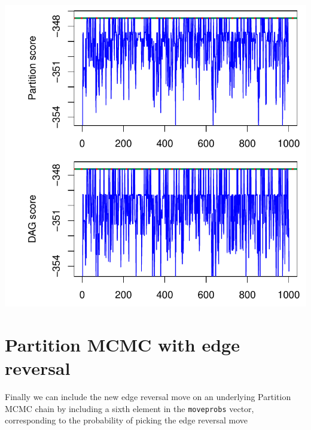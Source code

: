 \documentclass[a4paper]{article}\usepackage[]{graphicx}\usepackage[]{color}
\makeatletter
\def\maxwidth{ %
  \ifdim\Gin@nat@width>\linewidth
    \linewidth
  \else
    \Gin@nat@width
  \fi
}
\newenvironment{knitrout}{}{} %
\newcommand{\nn}{\noindent}
\makeatother
\begin{document}
\begin{knitrout}
{\centering \includegraphics[width=\maxwidth]{figure/minimal-unnamed-chunk-26-1} 

}



\end{knitrout}

\section{Partition MCMC with edge reversal}

\nn Finally we can include the new edge reversal move on an underlying Partition MCMC chain by including a sixth element in the \texttt{moveprobs} vector, corresponding to the probability of picking the edge reversal move
\end{document}
